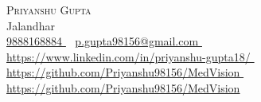 \documentclass[letterpaper,11pt]{article}
\begin{document}

\begin{center}
    {\Huge \scshape Priyanshu Gupta} \\ \vspace{1pt}
    Jalandhar \\ \vspace{1pt}
    \small 
    \href{tel:9888168884}{\underline{ 9888168884 }} ~
    \href{mailto:p.gupta98156@gmail.com}{\underline{ p.gupta98156@gmail.com }} ~
    \href{https://www.linkedin.com/in/priyanshu-gupta18/}{\underline{ https://www.linkedin.com/in/priyanshu-gupta18/ }} ~
    \href{https://github.com/Priyanshu98156/MedVision}{\underline{ https://github.com/Priyanshu98156/MedVision }} ~
    \href{https://www.hackerrank.com/https://github.com/Priyanshu98156/MedVision}{\underline{ https://github.com/Priyanshu98156/MedVision }} %
\end{center}
\end{document}
